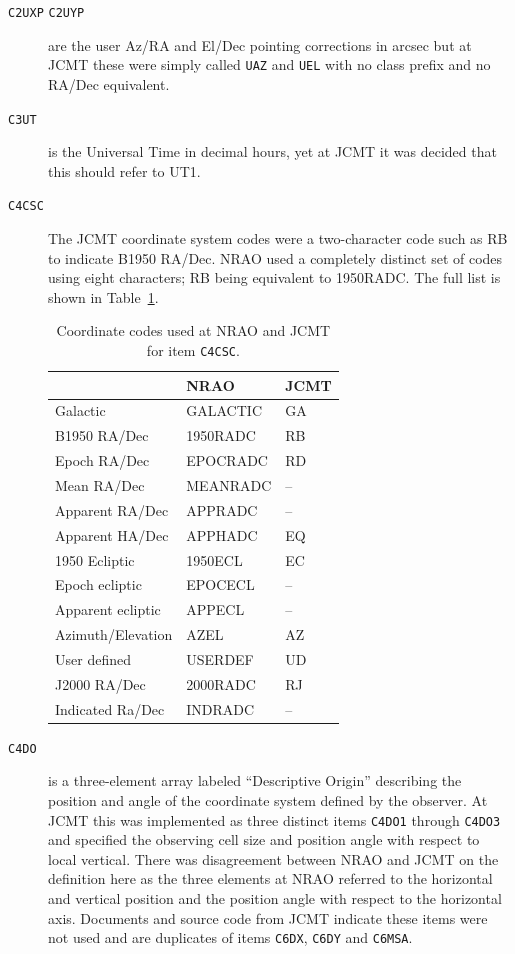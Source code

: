 \documentclass[final,authoryear,5p,times,twocolumn]{elsarticle}
\begin{document}
\begin{description}
\item[\texttt{C2UXP} \texttt{C2UYP}] are the user Az/RA and El/Dec
  pointing corrections in arcsec but at JCMT these were simply called
  \texttt{UAZ} and \texttt{UEL} with no class prefix and no RA/Dec
  equivalent.

\item[\texttt{C3UT}] is the Universal Time in decimal hours, yet at
  JCMT it was decided that this should refer to UT1.

\item[\texttt{C4CSC}] The JCMT coordinate system codes \citep{mtdn12}
  were a two-character code such as RB to indicate B1950 RA/Dec.
  NRAO used a completely distinct set of codes using eight
  characters; RB being equivalent to 1950RADC. The full list is shown
  in Table~\ref{tab:coordcodes}.

\begin{table}
\caption{Coordinate codes used at NRAO and JCMT for item
  \texttt{C4CSC}.}
\label{tab:coordcodes}
\begin{center}
\begin{tabular}{lll}
\hline
 & NRAO & JCMT \\ \hline
Galactic & GALACTIC & GA \\
B1950 RA/Dec & 1950RADC & RB \\
Epoch RA/Dec & EPOCRADC & RD \\
Mean RA/Dec & MEANRADC & -- \\
Apparent RA/Dec & APPRADC & -- \\
Apparent HA/Dec & APPHADC & EQ \\
1950 Ecliptic & 1950ECL & EC \\
Epoch ecliptic & EPOCECL & -- \\
Apparent ecliptic & APPECL & -- \\
Azimuth/Elevation & AZEL & AZ \\
User defined & USERDEF & UD \\
J2000 RA/Dec & 2000RADC & RJ \\
Indicated Ra/Dec & INDRADC & -- \\
\hline
\end{tabular}
\end{center}
\end{table}

\item[\texttt{C4DO}] is a three-element array labeled ``Descriptive
  Origin'' describing the position and angle of the coordinate system
  defined by the observer. At JCMT this was implemented as three
  distinct items \texttt{C4DO1} through \texttt{C4DO3} and specified
  the observing cell size and position angle with respect to local
  vertical. There was disagreement between NRAO and JCMT on the
  definition here as the three elements at NRAO referred to the
  horizontal and vertical position and the position angle with respect
  to the horizontal axis. Documents and source code from JCMT indicate
  these items were not used and are duplicates of items \texttt{C6DX},
  \texttt{C6DY} and \texttt{C6MSA}.


\end{description}
\end{document}
